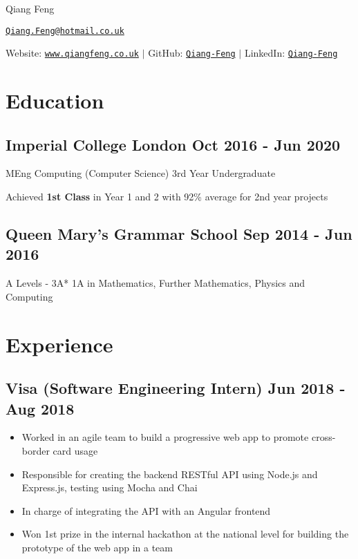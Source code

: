 \documentclass[a4paper]{article}
\begin{document}
\begin{center}
    {\huge Qiang Feng}

    \vspace{2pt}

    \href{mailto:Qiang.Feng@hotmail.co.uk}{\texttt{Qiang.Feng@hotmail.co.uk}}

    \vspace{2pt}

    Website: \href{https://www.qiangfeng.co.uk}{\texttt{www.qiangfeng.co.uk}} $\mid$
    GitHub: \href{https://github.com/Qiang-Feng}{\texttt{Qiang-Feng}} $\mid$
    LinkedIn: \href{https://www.linkedin.com/in/qiang-feng/}{\texttt{Qiang-Feng}}
\end{center}

\section*{Education}

\subsection*{Imperial College London \hfill Oct 2016 - Jun 2020}

MEng Computing (Computer Science) \hfill 3rd Year Undergraduate

Achieved \textbf{1st Class} in Year 1 and 2 with 92\% average for 2nd year projects

\subsection*{Queen Mary's Grammar School \hfill Sep 2014 - Jun 2016}

A Levels - 3A* 1A in Mathematics, Further Mathematics, Physics and Computing

\section*{Experience}

\subsection*{Visa \textnormal{(Software Engineering Intern)} \hfill Jun 2018 - Aug 2018}

\begin{itemize}
    \item Worked in an agile team to build a progressive web app to promote cross-border card usage
    \item Responsible for creating the backend RESTful API using Node.js and Express.js, testing using Mocha and Chai
    \item In charge of integrating the API with an Angular frontend
    \item Won 1st prize in the internal hackathon at the national level for building the prototype of the web app in a team
\end{itemize}
\end{document}
